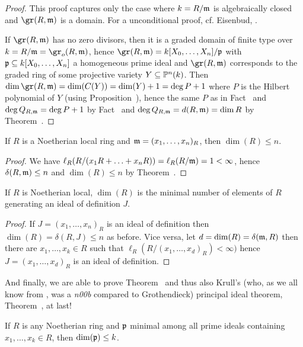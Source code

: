 \documentclass[a4paper,parskip=half,numbers=enddot, DIV=12]{scrreprt}
\begin{document}
\begin{proof}
    This proof captures only the case where $k=R/\mathfrak{m}$ is algebraically closed and $\gr(R,\mm)$ is a domain. For a unconditional proof, cf. Eisenbud, \cite[Corollary~12.5]{eisenbudCommAlg}.
    
    If $\gr(R,\mm)$ has no zero divisors, then it is a graded domain of finite type over $k=R/\mm=\gr_o(R,\mm)$, hence $\gr(R,\mm) = k[X_0,\ldots, X_n]/\pp$ with $\mathfrak{p}\subseteq k[X_0,\ldots,X_n]$ a homogeneous prime ideal and $\gr(R,\mm)$ corresponds to the graded ring of some projective variety $Y\subseteq \mathbb{P}^{n}(k)$. Then $\dim\gr(R,\mm) = \dim(C(Y)) = \dim(Y) +1 = \deg P+1 $ where $P$ is the Hilbert polynomial of $Y$ (using Proposition~), hence the same $P$ as in Fact~ and $\deg Q_{R,\mathfrak{m}} = \deg P+1$ by Fact~ and $\deg Q_{R,\mathfrak{m}}=d(R,\mathfrak{m})=\dim R$ by Theorem~.
\end{proof}
\begin{cor}
    If $R$ is a Noetherian local ring and $\mathfrak{m} =( x_1,\ldots, x_n)_R$, then $\dim(R) \leq n$.
\end{cor}
\begin{proof}
    We have $\ell_R(R/(x_1R+\ldots +x_nR) ) = \ell_R(R/\mathfrak{m}) = 1< \infty$, hence $\delta(R,\mathfrak{m}) \leq n$ and $\dim(R) \leq n$ by Theorem~.
\end{proof}
\begin{cor}
    If $R$ is Noetherian local, $\dim(R)$ is the minimal number of elements of $R$ generating an ideal of definition $J$.
\end{cor}
\begin{proof}
    If $J= (x_1,\ldots,x_n)_R$ is an ideal of definition then $\dim(R) = \delta(R,J) \leq n$ as before. Vice versa, let $d=\dim(R) = \delta(\mathfrak{m},R)$ then there are $x_1,\ldots, x_k\in R$ such that $\ell_R(R/(x_1,\ldots, x_d)_R)<\infty)$ hence $J= (x_1,\ldots, x_d)_R$ is an ideal of definition.
\end{proof}
And finally, we are able to prove Theorem~ and thus also Krull's (who, as we all know from \cite{alg1}, was a \emph{n00b} compared to Grothendieck) principal ideal theorem, Theorem~, at last!
\begin{cor}
    If $R$ is any Noetherian ring and $\mathfrak{p}$ minimal among all prime ideals containing $x_1,\ldots, x_k\in R$, then $\dim(\mathfrak{p}) \leq k$.
\end{cor}
\end{document}
